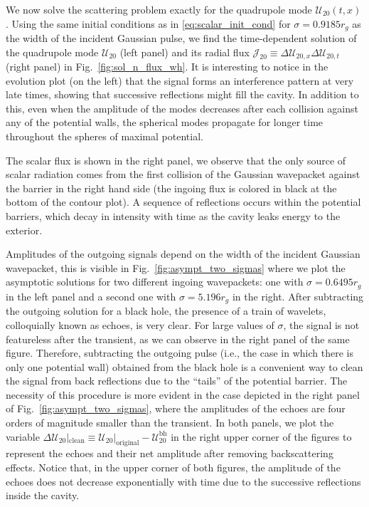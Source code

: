 \documentclass[article,aps,nofootinbib,twocolumn,superscriptaddress]{revtex4-1}
\begin{document}
We now solve the scattering problem exactly for the quadrupole mode $\mathcal{U}_{20}(t,x)$. Using the same initial conditions as in \eqref{eq:scalar_init_cond} for $\sigma=0.9185r_g$ as the width of the incident Gaussian pulse, we find the time-dependent solution of the quadrupole mode $\mathcal{U}_{20}$ (left panel) and its radial flux $\mathcal{J}_{20}\equiv \Delta\mathcal{U}_{20,x} \Delta \mathcal{U}_{20,t}$ (right panel) in Fig.~\ref{fig:sol_n_flux_wh}. It is interesting to notice in the evolution plot (on the left) that the signal forms an interference pattern at very late times, showing that successive reflections might fill the cavity. In addition to this, even when the amplitude of the modes decreases after each collision against any of the potential walls, the spherical modes propagate for longer time throughout the spheres of maximal potential. 

The scalar flux is shown in the right panel, we observe that the only source of scalar radiation comes from the first collision of the Gaussian wavepacket against the barrier in the right hand side (the ingoing flux is colored in black at the bottom of the contour plot). A sequence of reflections occurs within the potential barriers, which decay in intensity with time as the cavity leaks energy to the exterior.

Amplitudes of the outgoing signals depend on the width of the incident Gaussian wavepacket, this is visible in Fig.~\ref{fig:asympt_two_sigmas} where we plot the asymptotic solutions for two different ingoing wavepackets: one with $\sigma=0.6495r_g$ in the left panel and a second one with $\sigma=5.196r_g$ in the right. After subtracting the outgoing solution for a black hole, the presence of a train of wavelets, colloquially known as echoes, is very clear. For large values of $\sigma$, the signal is not featureless after the transient, as we can observe in the right panel of the same figure. Therefore, subtracting the outgoing pulse (i.e., the case in which there is only one potential wall) obtained from the black hole is a convenient way to clean the signal from back reflections due to the ``tails'' of the potential barrier. The necessity of this procedure is more evident in the case depicted in the right panel of Fig.~\ref{fig:asympt_two_sigmas}, where the amplitudes of the echoes are four orders of magnitude smaller than the transient. In both panels, we plot the variable $\Delta\mathcal{U}_{20}|_{\mathrm{clean}}\equiv\mathcal{U}_{20}|_{\mathrm{original}}-\mathcal{U}^{\mathrm{bh}}_{20}$ in the right upper corner of the figures to represent the echoes and their net amplitude after removing backscattering effects. Notice that, in the upper corner of both figures, the amplitude of the echoes does not decrease exponentially with time due to the successive reflections inside the cavity.
 
\end{document}
